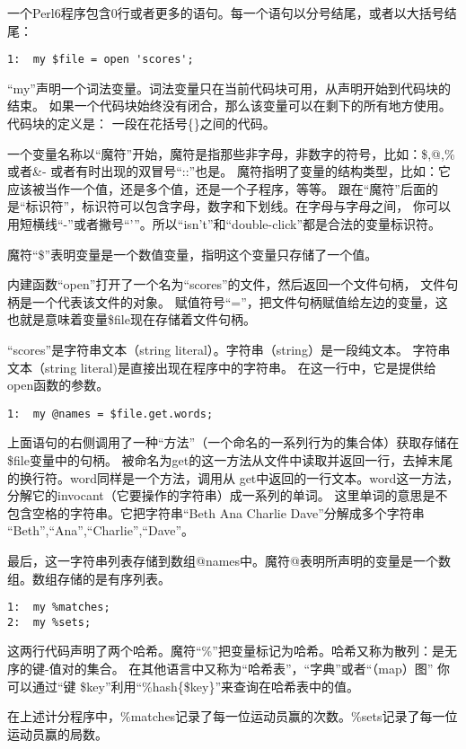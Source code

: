 \documentclass[11pt]{ctexart}
\begin{document}
一个Perl6程序包含0行或者更多的语句。每一个语句以分号结尾，或者以大括号结尾：

\begin{verbatim}
1:  my $file = open 'scores';
\end{verbatim}
``my''声明一个词法变量。词法变量只在当前代码块可用，从声明开始到代码块的结束。
如果一个代码块始终没有闭合，那么该变量可以在剩下的所有地方使用。代码块的定义是：
一段在花括号\{\}之间的代码。

一个变量名称以“魔符”开始，魔符是指那些非字母，非数字的符号，比如：\$,@,\% 或者\&-
或者有时出现的双冒号“::”也是。
魔符指明了变量的结构类型，比如：它应该被当作一个值，还是多个值，还是一个子程序，等等。
跟在“魔符”后面的是“标识符”，标识符可以包含字母，数字和下划线。在字母与字母之间，
你可以用短横线“-”或者撇号“'”。所以“isn't”和“double-click”都是合法的变量标识符。

魔符“\$”表明变量是一个数值变量，指明这个变量只存储了一个值。

内建函数“open”打开了一个名为“scores”的文件，然后返回一个文件句柄，
文件句柄是一个代表该文件的对象。
赋值符号“=”，把文件句柄赋值给左边的变量，这也就是意味着变量\$file现在存储着文件句柄。

“scores”是字符串文本（string literal）。字符串（string）是一段纯文本。
字符串文本（string literal)是直接出现在程序中的字符串。
在这一行中，它是提供给open函数的参数。


\begin{verbatim}
1:  my @names = $file.get.words;
\end{verbatim}
上面语句的右侧调用了一种“方法”（一个命名的一系列行为的集合体）获取存储在\$file变量中的句柄。
被命名为get的这一方法从文件中读取并返回一行，去掉末尾的换行符。word同样是一个方法，调用从
get中返回的一行文本。word这一方法，分解它的invocant（它要操作的字符串）成一系列的单词。
这里单词的意思是不包含空格的字符串。它把字符串“Beth Ana Charlie Dave”分解成多个字符串
“Beth”,“Ana”,“Charlie”,“Dave”。

最后，这一字符串列表存储到数组@names中。魔符@表明所声明的变量是一个数组。数组存储的是有序列表。


\begin{verbatim}
1:  my %matches;
2:  my %sets;
\end{verbatim}
这两行代码声明了两个哈希。魔符“\%”把变量标记为哈希。哈希又称为散列：是无序的键-值对的集合。
在其他语言中又称为“哈希表”，“字典”或者“（map）图”
你可以通过“键 \$key”利用“\%hash\{\$key\}”来查询在哈希表中的值。

在上述计分程序中，\%matches记录了每一位运动员赢的次数。\%sets记录了每一位运动员赢的局数。
\end{document}
